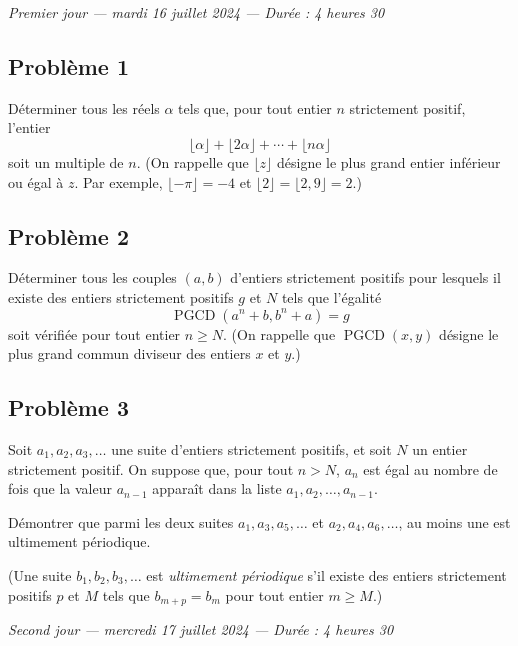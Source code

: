 
\begin{center}
  \emph{Premier jour --- mardi 16 juillet 2024 --- Durée : 4 heures 30}
\end{center}

\subsection*{Problème 1}
Déterminer tous les réels $\alpha$ tels que, pour tout entier $n$ strictement positif, l'entier
\[
\lfloor \alpha \rfloor + \lfloor 2\alpha \rfloor + \cdots + \lfloor n\alpha \rfloor
\]
soit un multiple de $n$. (On rappelle que $\lfloor z \rfloor$ désigne le plus grand entier inférieur ou égal
à $z$. Par exemple, $\lfloor -\pi \rfloor = -4$ et $\lfloor 2 \rfloor = \lfloor 2{,}9 \rfloor = 2$.)

\subsection*{Problème 2}
Déterminer tous les couples $(a, b)$ d'entiers strictement positifs pour lesquels il existe des entiers
strictement positifs $g$ et $N$ tels que l'égalité
\[
\operatorname{PGCD}(a^n + b, b^n + a) = g
\]
soit vérifiée pour tout entier $n \geqslant N$. (On rappelle que $\operatorname{PGCD}(x, y)$ désigne le
plus grand commun diviseur des entiers $x$ et $y$.)

\subsection*{Problème 3}
Soit $a_1, a_2, a_3, \ldots$ une suite d'entiers strictement positifs, et soit $N$ un entier strictement
positif. On suppose que, pour tout $n > N$, $a_n$ est égal au nombre de fois que la valeur $a_{n-1}$
apparaît dans la liste $a_1, a_2, \ldots, a_{n-1}$.

Démontrer que parmi les deux suites $a_1, a_3, a_5, \ldots$ et $a_2, a_4, a_6, \ldots$, au moins une est
ultimement périodique.

(Une suite $b_1, b_2, b_3, \ldots$ est \emph{ultimement périodique} s'il existe des entiers strictement
positifs $p$ et $M$ tels que $b_{m+p} = b_m$ pour tout entier $m \geqslant M$.)

\bigskip
\begin{center}
  \emph{Second jour --- mercredi 17 juillet 2024 --- Durée : 4 heures 30}
\end{center}

